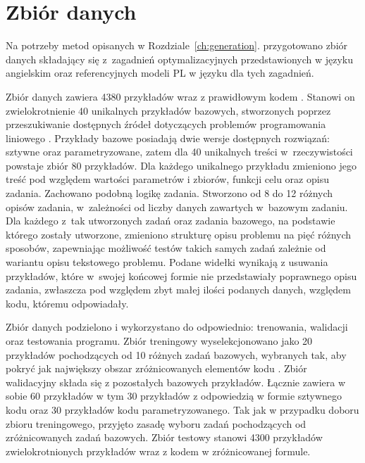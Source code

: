 
\chapter{Zbiór danych}\label{ch:dataset}

Na potrzeby metod opisanych w Rozdziale~\ref{ch:generation}. przygotowano zbiór danych składający się z~zagadnień optymalizacyjnych przedstawionych w języku angielskim oraz referencyjnych modeli PL w języku  dla tych zagadnień. %

Zbiór danych zawiera 4380 przykładów wraz z prawidłowym kodem . Stanowi on zwielokrotnienie 40 unikalnych przykładów bazowych, stworzonych poprzez przeszukiwanie dostępnych źródeł dotyczących problemów programowania liniowego \cite{brilliant_linear,byjus_linear,cimt,arsdcollege2020,libretexts_linear,superprof_linear,toppr_graphical}. Przykłady bazowe posiadają dwie wersje dostępnych rozwiązań: sztywne oraz parametryzowane, zatem dla 40 unikalnych treści w~rzeczywistości powstaje zbiór 80 przykładów. Dla każdego unikalnego przykładu zmieniono jego treść pod względem wartości parametrów i zbiorów, funkcji celu oraz opisu zadania. Zachowano podobną logikę zadania. Stworzono od 8 do 12 różnych opisów zadania, w~zależności od liczby danych zawartych w~bazowym zadaniu. Dla każdego z~tak utworzonych zadań oraz zadania bazowego, na podstawie którego zostały utworzone, zmieniono strukturę opisu problemu na pięć różnych sposobów, zapewniając możliwość testów takich samych zadań zależnie od wariantu opisu tekstowego problemu. Podane widełki wynikają z usuwania przykładów, które w~swojej końcowej formie nie przedstawiały poprawnego opisu zadania, zwłaszcza pod względem zbyt małej ilości podanych danych, względem kodu, któremu odpowiadały.

Zbiór danych podzielono i wykorzystano do odpowiednio: trenowania, walidacji oraz testowania programu. Zbiór treningowy wyselekcjonowano jako 20 przykładów pochodzących od 10 różnych zadań bazowych, wybranych tak, aby pokryć jak największy obszar zróżnicowanych elementów kodu . Zbiór walidacyjny składa się z pozostałych bazowych przykładów. Łącznie zawiera w sobie 60 przykładów w tym 30 przykładów z odpowiedzią w formie sztywnego kodu oraz 30 przykładów kodu parametryzowanego. Tak jak w przypadku doboru zbioru treningowego, przyjęto zasadę wyboru zadań pochodzących od zróżnicowanych zadań bazowych. Zbiór testowy stanowi 4300 przykładów zwielokrotnionych przykładów wraz z kodem  w zróżnicowanej formule.  %

